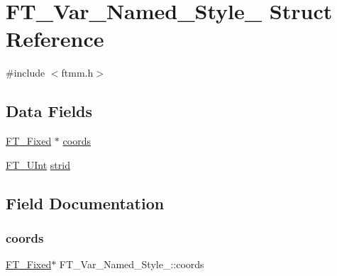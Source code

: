 \hypertarget{struct_f_t___var___named___style__}{}\section{F\+T\+\_\+\+Var\+\_\+\+Named\+\_\+\+Style\+\_\+ Struct Reference}
\label{struct_f_t___var___named___style__}


{\ttfamily \#include $<$ftmm.\+h$>$}

\subsection*{Data Fields}
\begin{DoxyCompactItemize}
\item 
\hyperlink{fttypes_8h_a5f5a679cc09f758efdd0d1c5feed3c3d}{F\+T\+\_\+\+Fixed} $\ast$ \hyperlink{struct_f_t___var___named___style___a07195d55aee541db651ef3a8b04bb41f}{coords}
\item 
\hyperlink{fttypes_8h_abcb8db4dbf35d2b55a9e8c7b0926dc52}{F\+T\+\_\+\+U\+Int} \hyperlink{struct_f_t___var___named___style___a7802f6958c6e883bdce16b9931002826}{strid}
\end{DoxyCompactItemize}


\subsection{Field Documentation}
\mbox{\label{struct_f_t___var___named___style___a07195d55aee541db651ef3a8b04bb41f}} 
\subsubsection{\texorpdfstring{coords}{coords}}
{\footnotesize\ttfamily \hyperlink{fttypes_8h_a5f5a679cc09f758efdd0d1c5feed3c3d}{F\+T\+\_\+\+Fixed}$\ast$ F\+T\+\_\+\+Var\+\_\+\+Named\+\_\+\+Style\+\_\+\+::coords}

\mbox{\label{struct_f_t___var___named___style___a7802f6958c6e883bdce16b9931002826}} 
